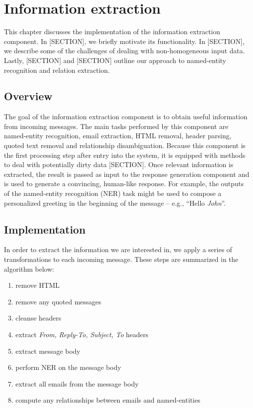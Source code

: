 \chapter{Information extraction}
This chapter discusses the implementation of the information extraction component. In [SECTION], we briefly motivate its functionality. In [SECTION], we describe some of the challenges of dealing with non-homogeneous input data. Lastly, [SECTION] and [SECTION] outline our approach to named-entity recognition and relation extraction.

\section{Overview}
The goal of the information extraction component is to obtain useful information from incoming messages. The main tasks performed by this component are named-entity recognition, email extraction, HTML removal, header parsing, quoted text removal and relationship disambiguation. Because this component is the first processing step after entry into the system, it is equipped with methods to deal with potentially dirty data [SECTION]. Once relevant information is extracted, the result is passed as input to the response generation component and is used to generate a convincing, human-like response. For example, the outputs of the named-entity recognition (NER) task might be used to compose a personalized greeting in the beginning of the message -- e.g., ``Hello \emph{John}''.

\section{Implementation}
In order to extract the information we are interested in, we apply a series of transformations to each incoming message. These steps are summarized in the algorithm below:
\begin{enumerate}
\item remove HTML %
\vspace{-5mm}
\item remove any quoted messages %
\vspace{-5mm}
\item cleanse headers %
\vspace{-5mm}
\item extract \textit{From, Reply-To, Subject, To} headers %
\vspace{-5mm}
\item extract message body %
\vspace{-5mm}
\item perform NER on the message body %
\vspace{-5mm}
\item extract all emails from the message body %
\vspace{-5mm}
\item compute any relationships between emails and named-entities %
\end{enumerate}


